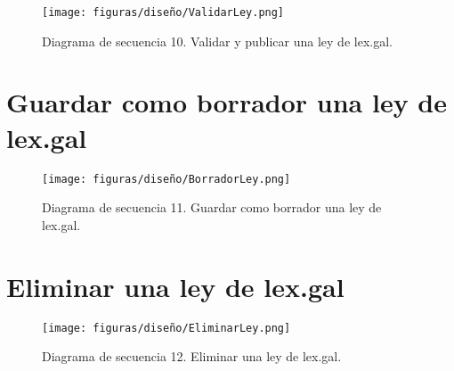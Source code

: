 \begin{figure}[H]
\centerline{\texttt{[image: figuras/diseño/ValidarLey.png]}}
\caption{Diagrama de secuencia 10. Validar y publicar una ley de lex.gal.}
\label{enlaceDBorradorLEXGAL}
\end{figure}

\newpage
\section{Guardar como borrador una ley de lex.gal}

\begin{figure}[H]
\centerline{\texttt{[image: figuras/diseño/BorradorLey.png]}}
\caption{Diagrama de secuencia 11. Guardar como borrador una ley de lex.gal.}
\label{enlaceDValidarLEXGAL}
\end{figure}


\section{Eliminar una ley de lex.gal}

\begin{figure}[H]
\centerline{\texttt{[image: figuras/diseño/EliminarLey.png]}}
\caption{Diagrama de secuencia 12. Eliminar una ley de lex.gal.}
\label{enlaceDEliminarLEXGAL}
\end{figure}